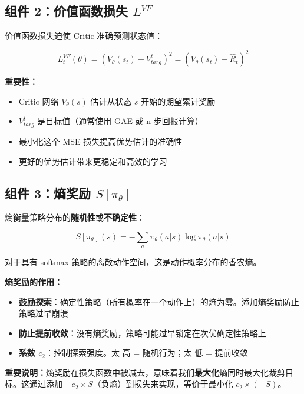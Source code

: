\documentclass[12pt,a4paper]{article}
\theoremstyle{noteplain}
\theoremstyle{noteexercise}
\begin{document}
\subsection{组件 2：价值函数损失 $L^{VF}$}

价值函数损失迫使 Critic 准确预测状态值：

\begin{equation}\label{eq:l-vf-detail}
  L_t^{VF}(\theta) = \left(V_\theta(s_t) - V_{targ}^t\right)^2 = \left(V_\theta(s_t) - \hat{R}_t\right)^2
\end{equation}

\textbf{重要性：}
\begin{itemize}
  \setlength{\itemsep}{0.2em}
  \item Critic 网络 $V_\theta(s)$ 估计从状态 $s$ 开始的期望累计奖励
  \item $V_{targ}^t$ 是目标值（通常使用 GAE 或 n 步回报计算）
  \item 最小化这个 MSE 损失提高优势估计的准确性
  \item 更好的优势估计带来更稳定和高效的学习
\end{itemize}

\subsection{组件 3：熵奖励 $S[\pi_\theta]$}

熵衡量策略分布的\textbf{随机性}或\textbf{不确定性}：

\begin{equation}\label{eq:entropy}
  S[\pi_\theta](s) = - \sum_a \pi_\theta(a|s) \log \pi_\theta(a|s)
\end{equation}

对于具有 softmax 策略的离散动作空间，这是动作概率分布的香农熵。

\textbf{熵奖励的作用：}
\begin{itemize}
  \setlength{\itemsep}{0.2em}
  \item \textbf{鼓励探索}：确定性策略（所有概率在一个动作上）的熵为零。添加熵奖励防止策略过早崩溃
  \item \textbf{防止提前收敛}：没有熵奖励，策略可能过早锁定在次优确定性策略上
  \item \textbf{系数 $c_2$}：控制探索强度。太 高 = 随机行为；太 低 = 提前收敛
\end{itemize}

\textbf{重要说明：}熵奖励在损失函数中被减去，意味着我们\textbf{最大化}熵同时最大化裁剪目标。这通过添加 $-c_2 \times S$（负熵）到损失来实现，等价于最小化 $c_2 \times (-S)$。
\end{document}
